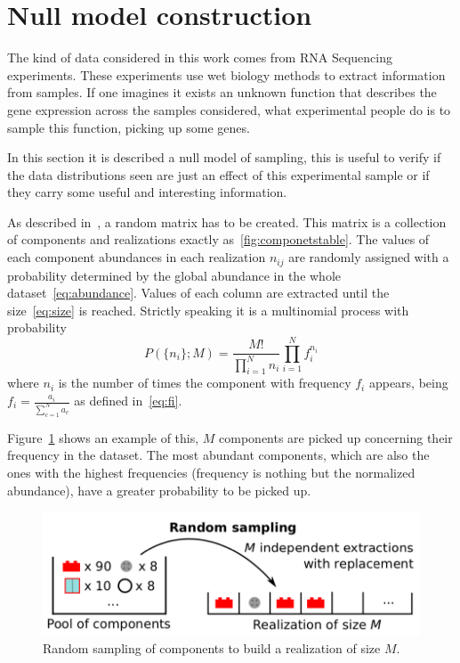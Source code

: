 \section{Null model construction}\label{sec:nullmodel}
The kind of data considered in this work comes from RNA Sequencing experiments. These experiments use wet biology methods to extract information from samples. If one imagines it exists an unknown function that describes the gene expression across the samples considered, what experimental people do is to sample this function, picking up some genes.

In this section it is described a null model of sampling, this is useful to verify if the data distributions seen are just an effect of this experimental sample or if they carry some useful and interesting information.

As described in~\cite{Mazzolini2018}, a random matrix has to be created. This matrix is a collection of components and realizations exactly as~\ref{fig:componetstable}. The values of each component abundances in each realization $n_{i j}$ are randomly assigned with a probability determined by 
the global abundance in the whole dataset~\ref{eq:abundance}. Values of each column are extracted until the size~\ref{eq:size} is 
reached. Strictly speaking it is a multinomial process with probability
\begin{equation}
P\left( \{ n_i\} ;M\right) =\frac{M!}{\prod_{i=1}^{N} n_i}\prod_{i=1}^N f_i^{n_i}
\end{equation}
where $n_i$ is the number of times the component with frequency $f_i$ appears, being $f_i=\frac{a_i}{\sum_{c=1}^{N}a_{c}}$ as defined in~\ref{eq:fi}.

Figure~\ref{fig:structure/randomsampling} shows an example of this, $M$ components are picked up concerning their frequency in the dataset. The most abundant components, which are also the ones with the highest frequencies (frequency is nothing but the normalized abundance), have a greater probability to be picked up.
\begin{figure}[htb!]
    \centering
    \includegraphics[width=0.8\linewidth]{pictures/structure/randomsampling.png}
    \caption{Random sampling of components to build a realization of size $M$.}
    \label{fig:structure/randomsampling}
\end{figure}

